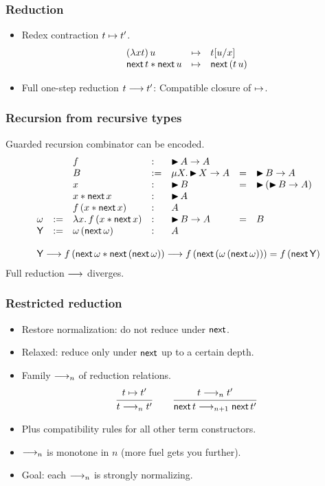 \documentclass[t]{beamer}
\newcommand{\nex}{\tnext\,}
\newcommand{\Y}{\mathsf{Y}}
\begin{document}
\begin{frame}%
  \frametitle{Reduction}
  \begin{itemize}
  \item Redex contraction $t \mapsto t'$.
\[
\begin{array}{lcl}
  (\lambda x t)\, u & \contr & \subst u x t \\
  \nex t \ast \nex u & \contr & \nex (t\,u) \\
\end{array}
\]
  \item Full one-step reduction $t \longrightarrow t'$: Compatible closure of $\mapsto$.
  \end{itemize}
\end{frame}


\begin{frame}%
  \frametitle{Recursion from recursive types}
Guarded recursion combinator can be encoded.
\[
\begin{array}{lllllll}
  &&f & : & \later A \to A \\
  &&B & := & \mu X.\, \later X \to A & = & \later B \to A \\
  &&x & : & \later B & = & \later (\later B \to A) \\
  &&x \ast \nex x & : & \later A \\
  &&f\,(x \ast \nex x) & : & A \\
  \omega & := & \lambda x. \, f\,(x \ast \nex x) & : & \later B \to A  & = & B \\
  \Y     & := & \omega \, (\nex \omega) & : & A \\
\\
\multicolumn 7 l {
  \Y \red f\,(\nex \omega \ast \nex (\nex \omega)) \red
  f\,(\nex (\omega \, (\nex \omega))) = f\, (\nex \Y)
}
\end{array}
\]
Full reduction $\longrightarrow$ diverges.
\end{frame}


\begin{frame}%
  \frametitle{Restricted reduction}
  \begin{itemize}
  \item Restore normalization: do not reduce under $\mathsf{next}$.
  \item Relaxed: reduce only under $\mathsf{next}$ up to a certain depth.
  \item Family $\longrightarrow_n$ of reduction relations.
\[
  \ru{t \contr t'}{t \red_n t'}
\qquad
  \ru{t \red_n t'}{\nex t \red_{n+1} \nex t'}
\]
  \item Plus compatibility rules for all other term constructors.
  \item $\longrightarrow_n$ is monotone in $n$  (more fuel gets you further).
  \item Goal: each $\longrightarrow_n$ is strongly normalizing.
  \end{itemize}
\end{frame}
\end{document}

